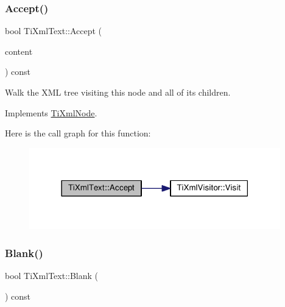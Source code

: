 \subsubsection{\texorpdfstring{Accept()}{Accept()}}
{\footnotesize\ttfamily bool Ti\+Xml\+Text\+::\+Accept (\begin{DoxyParamCaption}\item[{\hyperlink{class_ti_xml_visitor}{Ti\+Xml\+Visitor} $\ast$}]{content }\end{DoxyParamCaption}) const\hspace{0.3cm}{\ttfamily [virtual]}}

Walk the X\+ML tree visiting this node and all of its children. 

Implements \hyperlink{class_ti_xml_node_acc0f88b7462c6cb73809d410a4f5bb86}{Ti\+Xml\+Node}.

Here is the call graph for this function\+:\nopagebreak
\begin{figure}[H]
\begin{center}
\leavevmode
\includegraphics[width=309pt]{class_ti_xml_text_af65964326eac4640bfb97d4622fa0de2_cgraph}
\end{center}
\end{figure}
\mbox{\label{class_ti_xml_text_a0fd9005b279def46859b72f336b158da}} 
\subsubsection{\texorpdfstring{Blank()}{Blank()}}
{\footnotesize\ttfamily bool Ti\+Xml\+Text\+::\+Blank (\begin{DoxyParamCaption}{ }\end{DoxyParamCaption}) const\hspace{0.3cm}{\ttfamily [protected]}}

